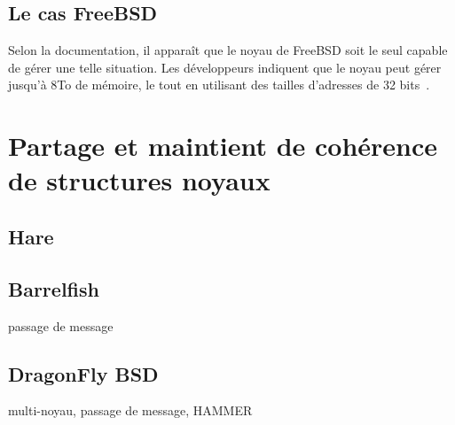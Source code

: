     \subsection{Le cas FreeBSD}

      Selon la documentation, il apparaît que le noyau de FreeBSD soit le seul
      capable de gérer une telle situation. Les développeurs indiquent que le
      noyau peut gérer jusqu’à 8To de mémoire, le tout en utilisant des tailles
      d’adresses de 32 bits~\citep{freebsd2015, mckenzie1994}.

      


  \section{Partage et maintient de cohérence de structures noyaux}

    \subsection{Hare}

    \subsection{Barrelfish}

      passage de message

    \subsection{DragonFly BSD}

      multi-noyau, passage de message, HAMMER
